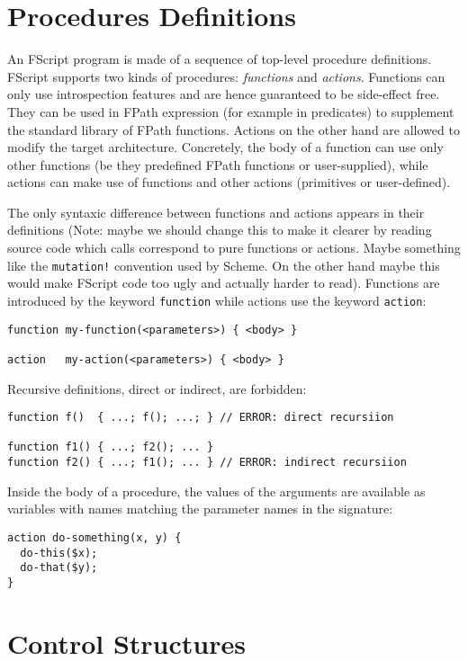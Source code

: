 \documentclass[a4paper,12pt]{report}
\begin{document}
\section{Procedures Definitions}
\label{sec:proc-def}

An FScript program is made of a sequence of top-level procedure definitions. FScript
supports two kinds of procedures: \emph{functions} and \emph{actions}. Functions can only
use introspection features and are hence guaranteed to be side-effect free. They can be
used in FPath expression (for example in predicates) to supplement the standard library of
FPath functions. Actions on the other hand are allowed to modify the target architecture.
Concretely, the body of a function can use only other functions (be they predefined FPath
functions or user-supplied), while actions can make use of functions and other actions
(primitives or user-defined).

The only syntaxic difference between functions and actions appears in their definitions
(Note: maybe we should change this to make it clearer by reading source code which calls
correspond to pure functions or actions. Maybe something like the \texttt{mutation!}
convention used by Scheme. On the other hand maybe this would make FScript code too ugly
and actually harder to read). Functions are introduced by the keyword \texttt{function}
while actions use the keyword \texttt{action}:

\begin{verbatim}
function my-function(<parameters>) { <body> }

action   my-action(<parameters>) { <body> }
\end{verbatim}

Recursive definitions, direct or indirect, are forbidden:
\begin{verbatim}
function f()  { ...; f(); ...; } // ERROR: direct recursiion

function f1() { ...; f2(); ... }
function f2() { ...; f1(); ... } // ERROR: indirect recursiion
\end{verbatim}

Inside the body of a procedure, the values of the arguments are available as variables
with names matching the parameter names in the signature:
\begin{verbatim}
action do-something(x, y) {
  do-this($x);
  do-that($y);
}
\end{verbatim}

\section{Control Structures}
\label{sec:control-structures}
\end{document}
